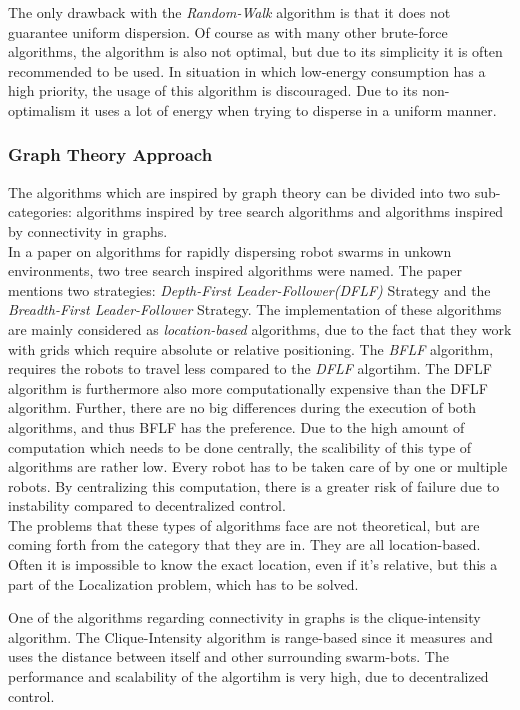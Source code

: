 The only drawback with the \emph{Random-Walk} algorithm is that it does not guarantee uniform dispersion.
Of course as with many other brute-force algorithms, the algorithm is also not optimal, but due to its simplicity it is often recommended to be used.
In situation in which low-energy consumption has a high priority, the usage of this algorithm is discouraged. Due to its non-optimalism it uses a lot of energy when trying to disperse in a uniform manner.

\subsubsection{Graph Theory Approach}
The algorithms which are inspired by graph theory can be divided into two sub-categories: algorithms inspired by tree search algorithms and algorithms inspired by connectivity in graphs.\\

In a paper on algorithms for rapidly dispersing robot swarms in unkown environments\cite{hsiang2004algorithms}, two tree search inspired algorithms were named.
The paper mentions two strategies: \emph{Depth-First Leader-Follower(DFLF)} Strategy and the \emph{Breadth-First Leader-Follower} Strategy.
The implementation of these algorithms are mainly considered as \emph{location-based} algorithms, due to the fact that they work with grids which require absolute or relative positioning.
The \emph{BFLF} algorithm, requires the robots to travel less compared to the \emph{DFLF} algortihm. The DFLF algorithm is furthermore also more computationally expensive than the DFLF algorithm.
Further, there are no big differences during the execution of both algorithms, and thus BFLF has the preference.
Due to the high amount of computation which needs to be done centrally, the scalibility of this type of algorithms are rather low.
Every robot has to be taken care of by one or multiple robots. By centralizing this computation, there is a greater risk of failure due to instability compared to decentralized control.\\

The problems that these types of algorithms face are not theoretical, but are coming forth from the category that they are in. They are all location-based. Often it is impossible to know the exact location, even if it's relative, but this a part of the Localization problem, which has to be solved.

One of the algorithms regarding connectivity in graphs is the clique-intensity algorithm.\cite{ugur2007dispersion}
The Clique-Intensity algorithm is range-based since it measures and uses the distance between itself and other surrounding swarm-bots.
The performance and scalability of the algortihm is very high, due to decentralized control.

